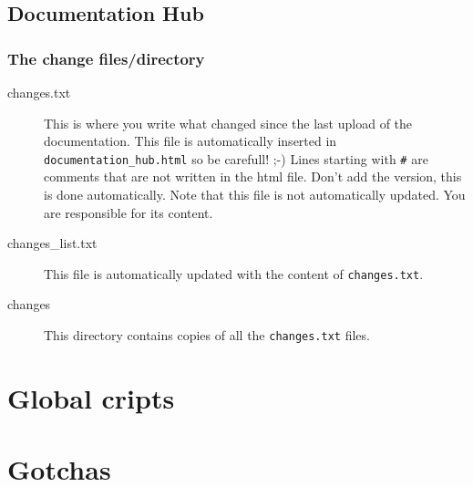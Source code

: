 \documentclass[a4paper,10pt]{article}
\begin{document}
\subsection{Documentation Hub}

\subsubsection{The change files/directory}

\begin{description}
 \item[changes.txt] This is where you write what changed since the last upload of the documentation. This file is automatically inserted in \verb+documentation_hub.html+ so be carefull! ;-) Lines starting with \verb+#+ are comments that are not written in the html file. Don't add the version, this is done automatically. Note that this file is not automatically updated. You are responsible for its content.
 \item[changes\_list.txt] This file is automatically updated with the content of \verb+changes.txt+.
 \item[changes] This directory contains copies of all the \verb+changes.txt+ files.
 \end{description}

\section{Global cripts}
\label{global_scripts}


\section{Gotchas}
\end{document}
